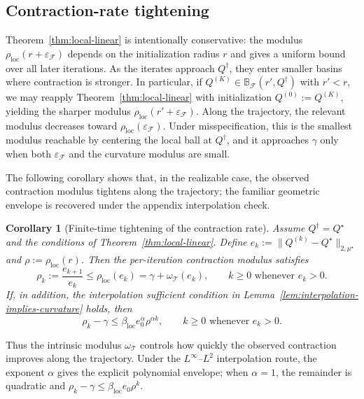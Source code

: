 \documentclass{article}
\newcommand{\loc}{\mathrm{loc}}
\theoremstyle{plain}
\newtheorem{corollary}{Corollary}
\theoremstyle{definition}
\theoremstyle{remark}
\begin{document}
\subsection{Contraction-rate tightening}
\label{app:rate-tightening}

Theorem~\ref{thm:local-linear} is intentionally conservative: the modulus
\(\rho_{\mathrm{loc}}(r+\varepsilon_{\mathcal F})\) depends on the initialization radius \(r\) and gives
a uniform bound over all later iterations. As the iterates approach
\(Q^\dagger\), they enter smaller basins where contraction is
stronger. In particular, if
\(Q^{(K)} \in \mathbb{B}_{\mathcal F}(r',Q^\dagger)\) with \(r'<r\),
we may reapply Theorem~\ref{thm:local-linear} with initialization
\(Q^{(0)}:=Q^{(K)}\), yielding the sharper modulus
\(\rho_{\mathrm{loc}}(r'+\varepsilon_{\mathcal F})\). Along the trajectory,
the relevant modulus decreases toward
\(\rho_{\mathrm{loc}}(\varepsilon_{\mathcal F})\). Under misspecification,
this is the smallest modulus reachable by centering the local ball at
\(Q^\dagger\), and it approaches \(\gamma\) only when both
\(\varepsilon_{\mathcal F}\) and the curvature modulus are small.

The following corollary shows that, in the realizable case, the observed
contraction modulus tightens along the trajectory; the familiar geometric
envelope is recovered under the appendix interpolation check.

\begin{corollary}[Finite-time tightening of the contraction rate]
\label{cor:finite-time-tightening}
Assume $Q^\dagger=Q^\star$ and the conditions of
Theorem~\ref{thm:local-linear}. Define
$e_k := \|Q^{(k)} - Q^\star\|_{2,\mu^\star}$ and
\(\rho:=\rho_{\mathrm{loc}}(r)\). Then the per-iteration contraction modulus
satisfies
\[
\rho_k:=\frac{e_{k+1}}{e_k}
\le \rho_{\mathrm{loc}}(e_k)
=\gamma+\omega_{\mathcal T}(e_k),
\qquad k\ge0\text{ whenever }e_k>0.
\]
If, in addition, the interpolation sufficient condition in
Lemma~\ref{lem:interpolation-implies-curvature} holds, then
\[
\rho_k-\gamma
\le
\beta_{\loc}e_0^\alpha \rho^{\alpha k},
\qquad k\ge0\text{ whenever }e_k>0.
\]
\end{corollary}

Thus the intrinsic modulus \(\omega_{\mathcal T}\) controls how quickly the
observed contraction improves along the trajectory. Under the
\(L^\infty\)--\(L^2\) interpolation route, the exponent \(\alpha\) gives the
explicit polynomial envelope; when \(\alpha=1\), the remainder is quadratic and
$\rho_k-\gamma \le \beta_{\loc} e_0 \rho^k$.
\end{document}

